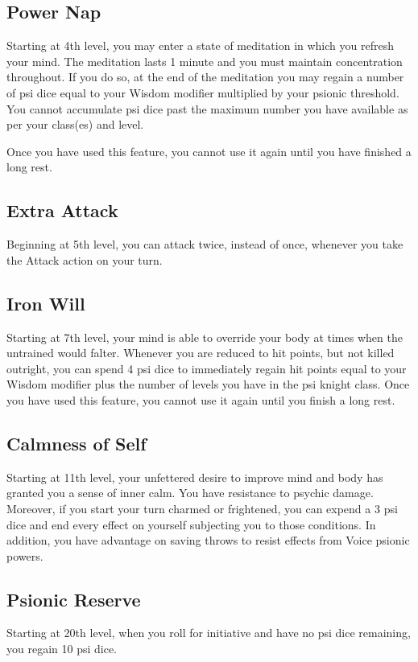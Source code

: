 \subsection{Power Nap}
Starting at 4th level,
you may enter a state of meditation
in which you refresh your mind.
The meditation lasts 1 minute and
you must maintain concentration throughout.
If you do so,
at the end of the meditation you may regain a number of psi dice
equal to your Wisdom modifier multiplied by your psionic threshold.
You cannot accumulate psi dice past the maximum number you have available
as per your class(es) and level.

Once you have used this feature,
you cannot use it again until you have finished a long rest.

\subsection{Extra Attack}
Beginning at 5th level, you can attack twice,
instead of once,
whenever you take the Attack action on your turn.

\subsection{Iron Will}
Starting at 7th level,
your mind is able to override your body at times
when the untrained would falter.
Whenever you are reduced to hit points,
but not killed outright,
you can spend 4 psi dice to immediately regain hit points
equal to your Wisdom modifier plus the number of levels
you have in the psi knight class.
Once you have used this feature,
you cannot use it again until you finish a long rest.

\subsection{Calmness of Self}
Starting at 11th level,
your unfettered desire to improve mind and body
has granted you a sense of inner calm.
You have resistance to psychic damage.
Moreover, if you start your turn charmed or frightened,
you can expend a 3 psi dice and end every effect on yourself
subjecting you to those conditions.
In addition, you have advantage on saving throws to resist
effects from Voice psionic powers.

\subsection{Psionic Reserve}
Starting at 20th level,
when you roll for initiative and have no psi dice remaining,
you regain 10 psi dice.

